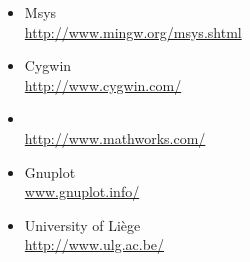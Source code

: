 \begin{itemize}
\item[]Msys\\
\url{http://www.mingw.org/msys.shtml}

\item[\raisebox{-5mm}{\texttt{[image: cygwinico]}}] \begin{minipage}{12cm}
Cygwin\\
\url{http://www.cygwin.com/}
\end{minipage}

\item[\raisebox{-4mm}{\texttt{[image: matlabico]}}] \begin{minipage}{12cm}
\matlab\\
\url{http://www.mathworks.com/}
\end{minipage}

\item[]Gnuplot\\
\url{www.gnuplot.info/}

\item[\raisebox{-4mm}{\texttt{[image: ulglogonew]}}] \begin{minipage}{12cm}
University of Liège\\
\url{http://www.ulg.ac.be/}
\end{minipage}


\end{itemize}